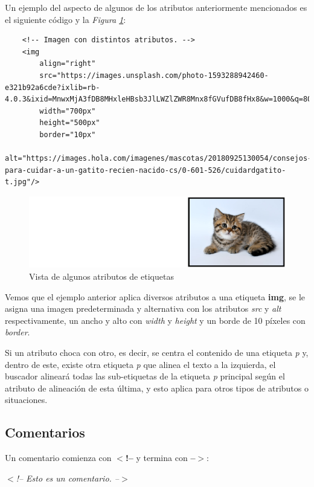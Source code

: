 Un ejemplo del aspecto de algunos de los atributos anteriormente mencionados es el siguiente código y la \textit{Figura \ref{fig: 3}}:
\begin{lstlisting}
    <!-- Imagen con distintos atributos. -->
    <img
        align="right" 
        src="https://images.unsplash.com/photo-1593288942460-e321b92a6cde?ixlib=rb-4.0.3&ixid=MnwxMjA3fDB8MHxleHBsb3JlLWZlZWR8Mnx8fGVufDB8fHx8&w=1000&q=80"
        width="700px" 
        height="500px" 
        border="10px" 
        alt="https://images.hola.com/imagenes/mascotas/20180925130054/consejos-para-cuidar-a-un-gatito-recien-nacido-cs/0-601-526/cuidardgatito-t.jpg"/>
\end{lstlisting}
\begin{figure}[H]
    \centering
    \caption{Vista de algunos atributos de etiquetas}
    \label{fig: 3}
    \includegraphics[width=13cm]{ss_html/imgs_atributos.png}
\end{figure}

Vemos que el ejemplo anterior aplica diversos atributos a una etiqueta \textbf{img}, se le asigna una imagen predeterminada y alternativa con los atributos \textit{src} y \textit{alt} respectivamente, un ancho y alto con \textit{width} y \textit{height} y un borde de 10 píxeles con \textit{border}.

Si un atributo choca con otro, es decir, se centra el contenido de una etiqueta \textit{p} y, dentro de este, existe otra etiqueta \textit{p} que alinea el texto a la izquierda, el buscador alineará todas las sub-etiquetas de la etiqueta \textit{p} principal según el atributo de alineación de esta última, y esto aplica para otros tipos de atributos o situaciones.


\subsection{Comentarios}
\hspace{0.55cm}Un comentario comienza con \textbf{$<$!--} y termina con \textbf{--$>$}:
\begin{center}
    \textit{$<$!-- Esto es un comentario. --$>$}
\end{center}



